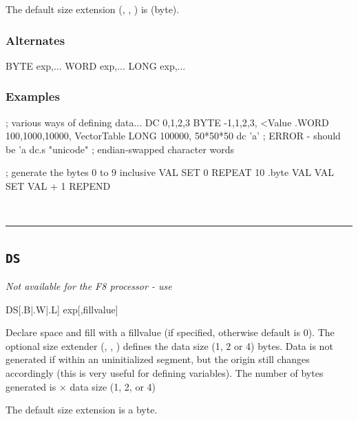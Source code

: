 The default size extension (, , ) is  (byte).

\subsubsection{Alternates}
\begin{usage}
   BYTE exp,...
   WORD exp,...
   LONG exp,...
\end{usage}

\subsubsection{Examples}

\begin{code}[caption=Data Generation]
; various ways of defining data...
  DC 0,1,2,3
  BYTE -1,1,2,3, <Value
  .WORD 100,1000,10000, VectorTable
  LONG 100000, 50*50*50
  dc 'a'  ; ERROR - should be 'a
  dc.s "unicode"   ; endian-swapped character words
\end{code}

\begin{code}[caption=Data Declaration using REPEAT Loop]
; generate the bytes 0 to 9 inclusive
VAL SET 0
    REPEAT 10
        .byte VAL
VAL SET VAL + 1
    REPEND
\end{code}\\




\hrule
\subsection{\texttt{DS}}
\label{pseudoop:ds}

\emph{Not available for the F8 processor - use }

\begin{usage}
  DS[{.B|.W|.L}] exp[,fillvalue]
\end{usage}

Declare space and fill with a fillvalue (if specified, otherwise default is 0). The optional size extender (, , ) defines the data size (1, 2 or 4) bytes. Data is not generated if within an uninitialized segment, but the origin still changes accordingly (this is very useful for defining variables). The number of bytes generated is  $\times$ data size (1, 2, or 4)

The default size extension is a byte.

